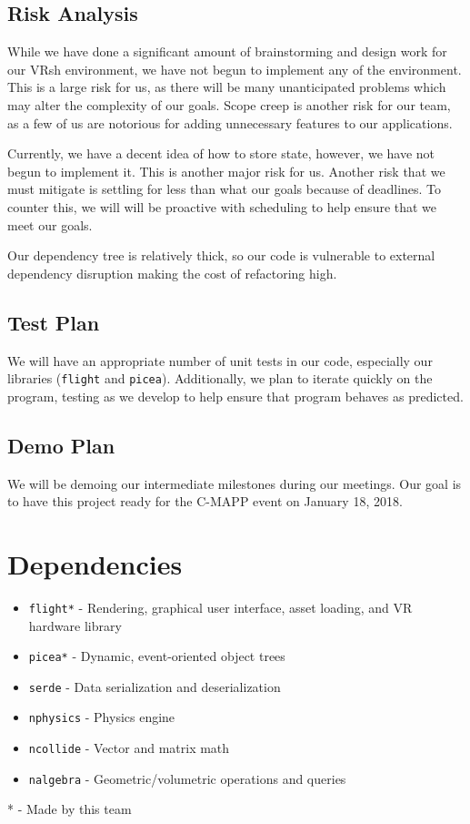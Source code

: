 \documentclass[titlepage,12pt]{article}
\newcommand\name{VRsh\xspace}
\begin{document}
\subsection{Risk Analysis}
While we have done a significant amount of brainstorming and design work for our
\name environment, we have not begun to implement any of the environment.  This
is a large risk for us, as there will be many unanticipated problems which may
alter the complexity of our goals. Scope creep is another risk for our team, as
a few of us are notorious for adding unnecessary features to our applications.

Currently, we have a decent idea of how to store state, however, we have not
begun to implement it. This is another major risk for us. Another risk that we
must mitigate is settling for less than what our goals because of deadlines. To
counter this, we will will be proactive with scheduling to help ensure that we
meet our goals.

Our dependency tree is relatively thick, so our code is vulnerable to external
dependency disruption making the cost of refactoring high.

\subsection{Test Plan}
We will have an appropriate number of unit tests in our code, especially our
libraries (\texttt{flight} and \texttt{picea}). Additionally, we plan to iterate
quickly on the program, testing as we develop to help ensure that program
behaves as predicted.

\subsection{Demo Plan}
We will be demoing our intermediate milestones during our meetings. Our goal is
to have this project ready for the C-MAPP event on January 18, 2018.

\section{Dependencies}

\begin{itemize}
    \item \texttt{flight*} - Rendering, graphical user interface, asset loading,
    and VR hardware library
    \item \texttt{picea*} - Dynamic, event-oriented object trees
    \item \texttt{serde} - Data serialization and deserialization
    \item \texttt{nphysics} - Physics engine
    \item \texttt{ncollide} - Vector and matrix math
    \item \texttt{nalgebra} - Geometric/volumetric operations and queries
\end{itemize}

* - Made by this team
\end{document}
